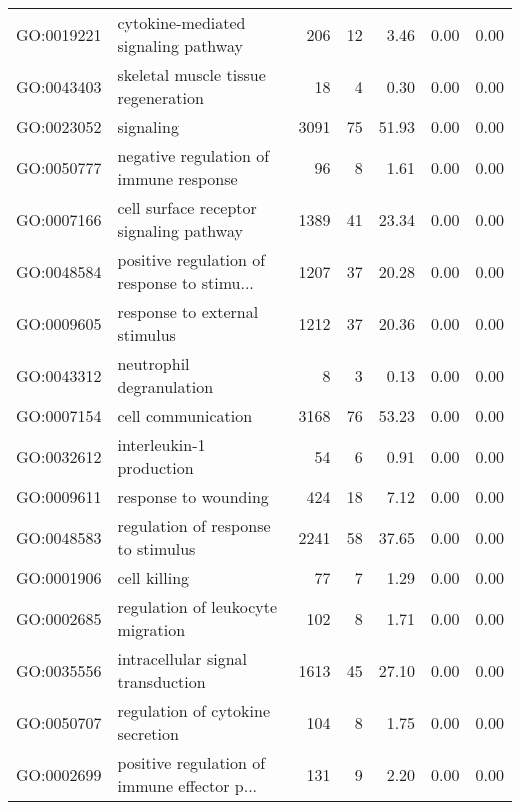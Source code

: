 \begin{table}[ht]
\begin{tabular}{llrrrrr}
  GO:0019221 & cytokine-mediated signaling pathway & 206 &  12 & 3.46 & 0.00 & 0.00 \\ 
  GO:0043403 & skeletal muscle tissue regeneration &  18 &   4 & 0.30 & 0.00 & 0.00 \\ 
  GO:0023052 & signaling & 3091 &  75 & 51.93 & 0.00 & 0.00 \\ 
  GO:0050777 & negative regulation of immune response &  96 &   8 & 1.61 & 0.00 & 0.00 \\ 
  GO:0007166 & cell surface receptor signaling pathway & 1389 &  41 & 23.34 & 0.00 & 0.00 \\ 
  GO:0048584 & positive regulation of response to stimu... & 1207 &  37 & 20.28 & 0.00 & 0.00 \\ 
  GO:0009605 & response to external stimulus & 1212 &  37 & 20.36 & 0.00 & 0.00 \\ 
  GO:0043312 & neutrophil degranulation &   8 &   3 & 0.13 & 0.00 & 0.00 \\ 
  GO:0007154 & cell communication & 3168 &  76 & 53.23 & 0.00 & 0.00 \\ 
  GO:0032612 & interleukin-1 production &  54 &   6 & 0.91 & 0.00 & 0.00 \\ 
  GO:0009611 & response to wounding & 424 &  18 & 7.12 & 0.00 & 0.00 \\ 
  GO:0048583 & regulation of response to stimulus & 2241 &  58 & 37.65 & 0.00 & 0.00 \\ 
  GO:0001906 & cell killing &  77 &   7 & 1.29 & 0.00 & 0.00 \\ 
  GO:0002685 & regulation of leukocyte migration & 102 &   8 & 1.71 & 0.00 & 0.00 \\ 
  GO:0035556 & intracellular signal transduction & 1613 &  45 & 27.10 & 0.00 & 0.00 \\ 
  GO:0050707 & regulation of cytokine secretion & 104 &   8 & 1.75 & 0.00 & 0.00 \\ 
  GO:0002699 & positive regulation of immune effector p... & 131 &   9 & 2.20 & 0.00 & 0.00 \\ 
   \hline
\end{tabular}
\end{table}
